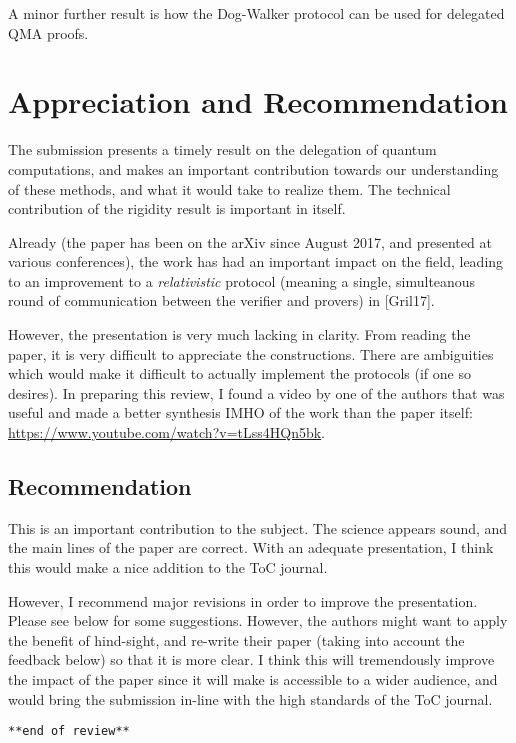 \documentclass[11pt]{article}
\newcommand{\DW}{{\sf Dog-Walker }}
\begin{document}
A minor further result is how the \DW protocol can be used for delegated QMA proofs.


\section{Appreciation and Recommendation}

The submission presents a timely result on the delegation of quantum computations, and makes an important contribution towards our understanding of these methods, and what it would take to realize them. The technical contribution of the rigidity result is important in itself.

Already (the paper has been on the arXiv since August 2017, and presented at various conferences), the work has had an important impact on the field, leading to an improvement to a \emph{relativistic} protocol (meaning a single, simulteanous round of communication between the verifier and provers) in [Gril17].

However, the presentation is very much lacking in clarity. From reading the paper, it is very difficult to appreciate the constructions. There are ambiguities which would make it difficult to actually implement the protocols (if one so desires). In preparing this review, I found a video by one of the authors that was useful and made a better synthesis IMHO of the work than the paper itself: \url{https://www.youtube.com/watch?v=tLss4HQn5bk}.



\subsection{Recommendation}

This is an important contribution to the subject. The science appears sound, and the main lines of the paper are correct. With an adequate presentation, I think this would make a nice addition to the ToC journal.

However, I recommend major revisions in order to improve the presentation. Please see below for some suggestions. However, the authors might want to apply the benefit of hind-sight, and  re-write their paper (taking into account the feedback below) so that it is more clear. I think this will tremendously improve the impact of the paper since it will make is accessible to a wider audience, and would bring the submission in-line with the high standards of the ToC journal.

\texttt{**end of review**}
\end{document}
